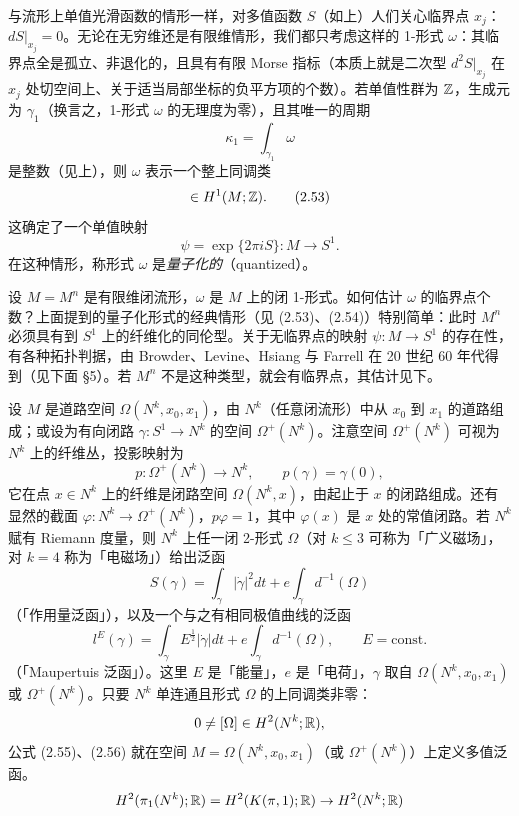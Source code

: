 与流形上单值光滑函数的情形一样，对多值函数 $S$（如上）人们关心临界点 $x_j$：$dS|_{x_j}=0$。无论在无穷维还是有限维情形，我们都只考虑这样的 1-形式 $\omega$：其临界点全是孤立、非退化的，且具有有限 Morse 指标（本质上就是二次型 $d^2S|_{x_j}$ 在 $x_j$ 处切空间上、关于适当局部坐标的负平方项的个数）。若单值性群为 $\mathbb{Z}$，生成元为 $\gamma_1$（换言之，1-形式 $\omega$ 的无理度为零），且其唯一的周期
\[
  \kappa_1=\int_{\gamma_1}\omega
\]
是整数（见上），则 $\omega$ 表示一个整上同调类
\begin{equation}
  [\omega]\in H^1(M;\Z). \tag{2.53}
\end{equation}
这确定了一个单值映射
\begin{equation}
  \psi=\exp\{2\pi iS\}:M\to S^1. \tag{2.54}
\end{equation}
在这种情形，称形式 $\omega$ 是\emph{量子化的}（quantized）。

 设 $M=M^n$ 是有限维闭流形，$\omega$ 是 $M$ 上的闭 1-形式。如何估计 $\omega$ 的临界点个数？上面提到的量子化形式的经典情形（见 (2.53)、(2.54)）特别简单：此时 $M^n$ 必须具有到 $S^1$ 上的纤维化的同伦型。关于无临界点的映射 $\psi:M\to S^1$ 的存在性，有各种拓扑判据，由 Browder、Levine、Hsiang 与 Farrell 在 20 世纪 60 年代得到（见下面 §5）。若 $M^n$ 不是这种类型，就会有临界点，其估计见下。

 设 $M$ 是道路空间 $\Omega(N^k,x_0,x_1)$，由 $N^k$（任意闭流形）中从 $x_0$ 到 $x_1$ 的道路组成；或设为有向闭路 $\gamma:S^1\to N^k$ 的空间 $\Omega^+(N^k)$。注意空间 $\Omega^+(N^k)$ 可视为 $N^k$ 上的纤维丛，投影映射为
\[
  p:\Omega^+(N^k)\to N^k,\qquad p(\gamma)=\gamma(0),
\]
它在点 $x\in N^k$ 上的纤维是闭路空间 $\Omega(N^k,x)$，由起止于 $x$ 的闭路组成。还有显然的截面 $\varphi:N^k\to\Omega^+(N^k)$，$p\varphi=1$，其中 $\varphi(x)$ 是 $x$ 处的常值闭路。若 $N^k$ 赋有 Riemann 度量，则 $N^k$ 上任一闭 2-形式 $\Omega$（对 $k\le3$ 可称为「广义磁场」，对 $k=4$ 称为「电磁场」）给出泛函
\begin{equation}
  S(\gamma)=\int_\gamma|\dot\gamma|^2dt+e\int_\gamma d^{-1}(\Omega) \tag{2.55}
\end{equation}
（「作用量泛函」），以及一个与之有相同极值曲线的泛函
\begin{equation}
  l^E(\gamma)=\int_\gamma E^{\frac12}|\dot\gamma|dt+e\int_\gamma d^{-1}(\Omega),
  \qquad E=\mathrm{const}. \tag{2.56}
\end{equation}
（「Maupertuis 泛函」）。这里 $E$ 是「能量」，$e$ 是「电荷」，$\gamma$ 取自 $\Omega(N^k,x_0,x_1)$ 或 $\Omega^+(N^k)$。只要 $N^k$ 单连通且形式 $\Omega$ 的上同调类非零：
\[
  0\ne[\Omega]\in H^2(N^k;\mathbb{R}),
\]
公式 (2.55)、(2.56) 就在空间 $M=\Omega(N^k,x_0,x_1)$（或 $\Omega^+(N^k)$）上定义多值泛函。
\[
  H^2(\pi_1(N^k);\mathbb{R})=H^2(K(\pi,1);\mathbb{R})\to H^2(N^k;\mathbb{R})
\]

